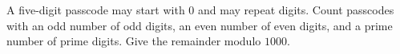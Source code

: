 A five-digit passcode may start with $0$ and may repeat digits. Count passcodes with an odd number of odd digits, an even number of even digits, and a prime number of prime digits. Give the remainder modulo $1000$.
